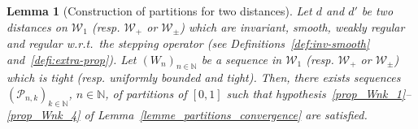 \documentclass{amsart}
\newcommand{\wrt}{w.r.t.\ }
\theoremstyle{plain}
\newtheorem{lemme}[Th]{Lemma}
\theoremstyle{definition}
\newcommand{\signed}{\pm}
\newcommand{\Graphon}{\mathcal{W}_1}
\newcommand{\Kernel}{\mathcal{W}_{\signed}}
\newcommand{\Kernelp}{\mathcal{W}_{+}}
\newcommand{\N}{\mathbb{N}}
\begin{document}
\begin{lemme}[Construction of partitions for two distances]
	\label{lemme_partitions_two_distances}
  Let  $d$  and  $d'$ be   two  distances  on  $\Graphon$  (resp.
  $\Kernelp$ or $\Kernel$) which  are invariant,  smooth, weakly regular  and regular
  \wrt  the stepping  operator (see  Definitions~\ref{def:inv-smooth}
  and~\ref{defi:extra-prop}).
  Let $(W_n  )_{n\in\N}$  be a
  sequence in  $\Graphon$ (resp. $\Kernelp$ or $\Kernel$) which is tight
  	(resp. uniformly bounded and   tight).    
  Then,   there   exists   sequences   
  $(\mathcal{P}_{n,k})_{k\in   \N}$,  $n\in\N$,   of   partitions of   $[0,1]$ 
  such   that  hypothesis~\ref{prop_Wnk_1}--\ref{prop_Wnk_4} of
  Lemma~\ref{lemme_partitions_convergence} are satisfied.
\end{lemme}
\end{document}
